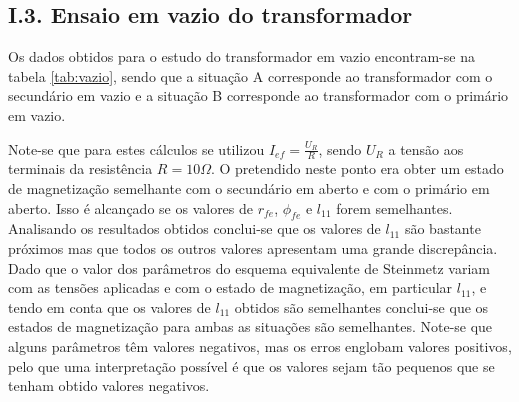 \documentclass[%
  reprint,
  nofootinbib,
  amsmath,amssymb,
  aps,
  10pt,
]{revtex4-1}
\begin{document}
\subsection*{I.3. Ensaio em vazio do transformador}
Os dados obtidos para o estudo do transformador em vazio encontram-se na tabela \ref{tab:vazio}, sendo que a situação A corresponde ao transformador com o secundário em vazio e a situação B corresponde ao transformador com o primário em vazio.


Note-se que para estes cálculos se utilizou $I_{ef}=	\frac{U_R}{R}$, sendo $U_R$ a tensão aos terminais da resistência $R=10\Omega$.
O pretendido neste ponto era obter um estado de magnetização semelhante com o secundário em aberto e com o primário em aberto. Isso é alcançado se os valores de $r_{fe}$, $\phi_{fe}$  e $l_{11}$ forem semelhantes. Analisando os resultados obtidos conclui-se que os valores de $l_{11}$ são bastante próximos mas que todos os outros valores apresentam uma grande discrepância. Dado que o valor dos parâmetros do esquema equivalente de Steinmetz variam com as tensões aplicadas e com o estado de magnetização, em particular $l_{11}$, e tendo em conta  que os valores de $l_{11}$ obtidos são semelhantes conclui-se que os estados de magnetização para ambas as situações são semelhantes.
Note-se que alguns parâmetros têm valores negativos, mas os erros englobam valores positivos, pelo que uma interpretação possível é que os valores sejam tão pequenos que se tenham obtido valores negativos.
\end{document}
